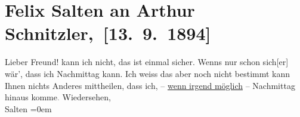 

         
         \renewcommand{\erwaehntePersonen}{Personen: Felix Salten}
         \renewcommand{\erwaehnteOrte}{Orte: Wien}
         \renewcommand{\erwaehnteWerke}{}
               \section[ Felix Salten an Arthur Schnitzler, {[}13. 9. 1894{]}]{ Felix Salten an Arthur Schnitzler, {[}13. 9. 1894{]}}\nopagebreak{}\rehead{ }\begin{ledgroupsized}[t]{13cm}\normalsize\beginnumbering{} \toendnotes[C]{\smallbreak\pagebreak[2]} 
\toendnotes[C]{\smallbreak}\pstart{}{\pb}Lieber Freund!\pend\pstart
           \label{K_L03146-1v}\label{K_L03146-1h} kann ich nicht, das
               ist einmal sicher. Wenns nur schon sich{[}er{]} wär’, dass ich
                  Nachmittag kann. Ich weiss das aber noch nicht bestimmt {\kaufmannsund} kann Ihnen nichts {\pb}Anderes mittheilen, dass ich, –
                  \uline{wenn irgend möglich} – Nachmittag
               hinaus komme\textcolor{gray}{.}\pend
           \pstart
           Wiedersehen, {\\[\baselineskip]}\spacefill\mbox{Salten}\pend
           \leftskip=0em{}
         
         \endnumbering{}\end{ledgroupsized}  \newcommand{\dateiname}{L03146}\newcommand{\titel}{Felix Salten an Arthur Schnitzler, [13. 9. 1894]}\newcommand{\editorInnen}{Martin Anton Müller und Laura Untner}
      